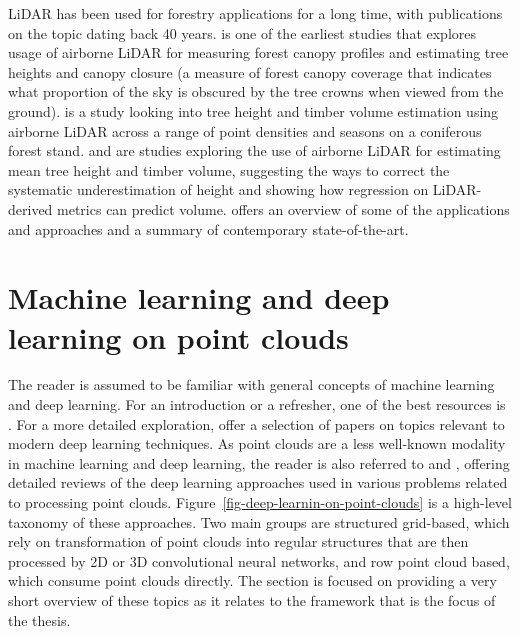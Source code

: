 LiDAR has been used for forestry applications for a long time, with publications on the topic dating back 40 years.
\citet{nelsonDeterminingForestCanopy1984} is one of the earliest studies that explores usage of airborne LiDAR for measuring forest canopy profiles and estimating tree heights and canopy closure (a measure of forest canopy coverage that indicates what proportion of the sky is obscured by the tree crowns when viewed from the ground).
\citet{nilssonEstimationTreeHeights1996} is a study looking into tree height and timber volume estimation using airborne LiDAR across a range of point densities and seasons on a coniferous forest stand.
\citet{naessetDeterminationMeanTree1997} and \citet{naessetEstimatingTimberVolume1997} are studies exploring the use of airborne LiDAR for estimating mean tree height and timber volume, suggesting the ways to correct the systematic underestimation of height and showing how regression on LiDAR-derived metrics can predict volume.
\citet{carson2004lidar} offers an overview of some of the applications and approaches and a summary of contemporary state-of-the-art.

\section{Machine learning and deep learning on point clouds}\label{sec-ml-dl}

The reader is assumed to be familiar with general concepts of machine learning and deep learning.
For an introduction or a refresher, one of the best resources is \citet{goodfellowDeepLearning2016}.
For a more detailed exploration, \citet{wangRecentAdvancesDeep2020} offer a selection of papers on topics relevant to modern deep learning techniques.
As point clouds are a less well-known modality in machine learning and deep learning, the reader is also referred to \citet{belloReviewDeepLearning2020} and \citet{guoDeepLearning3D2021}, offering detailed reviews of the deep learning approaches used in various problems related to processing point clouds.
Figure~\ref{fig-deep-learnin-on-point-clouds} is a high-level taxonomy of these approaches.
Two main groups are structured grid-based, which rely on transformation of point clouds into regular structures that are then processed by 2D or 3D convolutional neural networks, and row point cloud based, which consume point clouds directly.
The section is focused on providing a very short overview of these topics as it relates to the framework that is the focus of the thesis.

